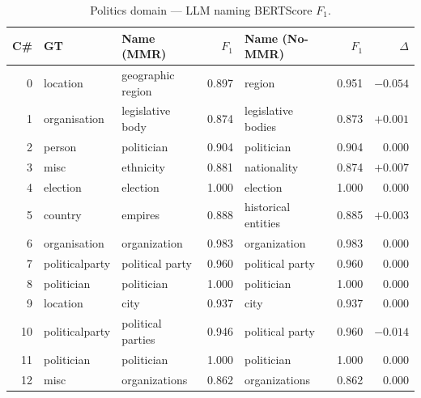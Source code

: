 \documentclass[11pt,a4paper]{article}
\begin{document}
\begin{table}[h]
\centering
\caption{Politics domain --- LLM naming BERTScore $F_1$.}
\label{tab:pol}
\small
\setlength{\tabcolsep}{4pt}
\begin{tabular}{r l l r l r r}
\toprule
\textbf{C\#} & \textbf{GT} &
  \textbf{Name (MMR)} & \textbf{$F_1$} &
  \textbf{Name (No-MMR)} & \textbf{$F_1$} &
  \textbf{$\Delta$} \\
\midrule
0  & location      & geographic region  & \cellcolor{red!15}0.897 & region           & \cellcolor{yellow!25}0.951 & $-0.054$ \\
1  & organisation  & legislative body   & \cellcolor{red!15}0.874 & legislative bodies & \cellcolor{red!15}0.873 & $+0.001$ \\
2  & person        & politician         & \cellcolor{yellow!25}0.904 & politician       & \cellcolor{yellow!25}0.904 & $0.000$ \\
3  & misc          & ethnicity          & \cellcolor{red!15}0.881 & nationality      & \cellcolor{red!15}0.874 & $+0.007$ \\
4  & election      & election           & \cellcolor{green!15}1.000 & election         & \cellcolor{green!15}1.000 & $0.000$ \\
5  & country       & empires            & \cellcolor{red!15}0.888 & historical entities & \cellcolor{red!15}0.885 & $+0.003$ \\
6  & organisation  & organization       & \cellcolor{yellow!25}0.983 & organization     & \cellcolor{yellow!25}0.983 & $0.000$ \\
7  & politicalparty& political party    & \cellcolor{yellow!25}0.960 & political party  & \cellcolor{yellow!25}0.960 & $0.000$ \\
8  & politician    & politician         & \cellcolor{green!15}1.000 & politician       & \cellcolor{green!15}1.000 & $0.000$ \\
9  & location      & city               & \cellcolor{yellow!25}0.937 & city             & \cellcolor{yellow!25}0.937 & $0.000$ \\
10 & politicalparty& political parties  & \cellcolor{yellow!25}0.946 & political party  & \cellcolor{yellow!25}0.960 & $-0.014$ \\
11 & politician    & politician         & \cellcolor{green!15}1.000 & politician       & \cellcolor{green!15}1.000 & $0.000$ \\
12 & misc          & organizations      & \cellcolor{red!15}0.862 & organizations    & \cellcolor{red!15}0.862 & $0.000$ \\

\end{tabular}
\end{table}
\end{document}
